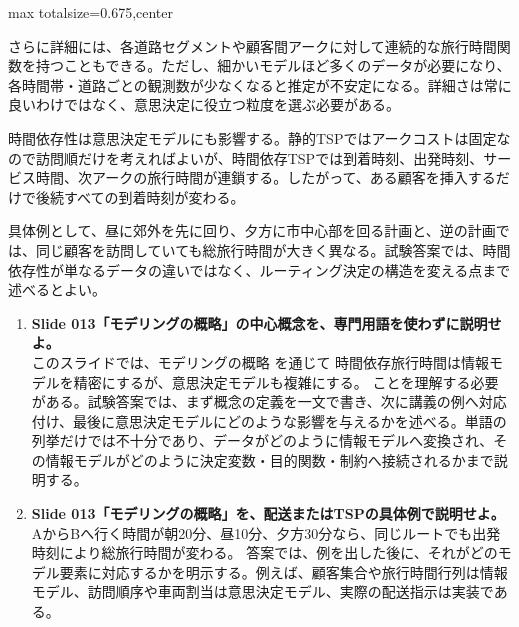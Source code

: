 \begin{adjustbox}{max totalsize={\textwidth}{0.675\textheight},center}
\begin{minipage}{\textwidth}
\begin{minipage}[t]{0.485\textwidth}
さらに詳細には、各道路セグメントや顧客間アークに対して連続的な旅行時間関数を持つこともできる。ただし、細かいモデルほど多くのデータが必要になり、各時間帯・道路ごとの観測数が少なくなると推定が不安定になる。詳細さは常に良いわけではなく、意思決定に役立つ粒度を選ぶ必要がある。\par
時間依存性は意思決定モデルにも影響する。静的TSPではアークコストは固定なので訪問順だけを考えればよいが、時間依存TSPでは到着時刻、出発時刻、サービス時間、次アークの旅行時間が連鎖する。したがって、ある顧客を挿入するだけで後続すべての到着時刻が変わる。\par
具体例として、昼に郊外を先に回り、夕方に市中心部を回る計画と、逆の計画では、同じ顧客を訪問していても総旅行時間が大きく異なる。試験答案では、時間依存性が単なるデータの違いではなく、ルーティング決定の構造を変える点まで述べるとよい。\par
{}
\begin{enumerate}
\item \textbf{Slide 013「モデリングの概略」の中心概念を、専門用語を使わずに説明せよ。}\\このスライドでは、モデリングの概略 を通じて 時間依存旅行時間は情報モデルを精密にするが、意思決定モデルも複雑にする。 ことを理解する必要がある。試験答案では、まず概念の定義を一文で書き、次に講義の例へ対応付け、最後に意思決定モデルにどのような影響を与えるかを述べる。単語の列挙だけでは不十分であり、データがどのように情報モデルへ変換され、その情報モデルがどのように決定変数・目的関数・制約へ接続されるかまで説明する。
\item \textbf{Slide 013「モデリングの概略」を、配送またはTSPの具体例で説明せよ。}\\AからBへ行く時間が朝20分、昼10分、夕方30分なら、同じルートでも出発時刻により総旅行時間が変わる。 答案では、例を出した後に、それがどのモデル要素に対応するかを明示する。例えば、顧客集合や旅行時間行列は情報モデル、訪問順序や車両割当は意思決定モデル、実際の配送指示は実装である。
\end{enumerate}
\end{minipage}
\end{minipage}
\end{adjustbox}

